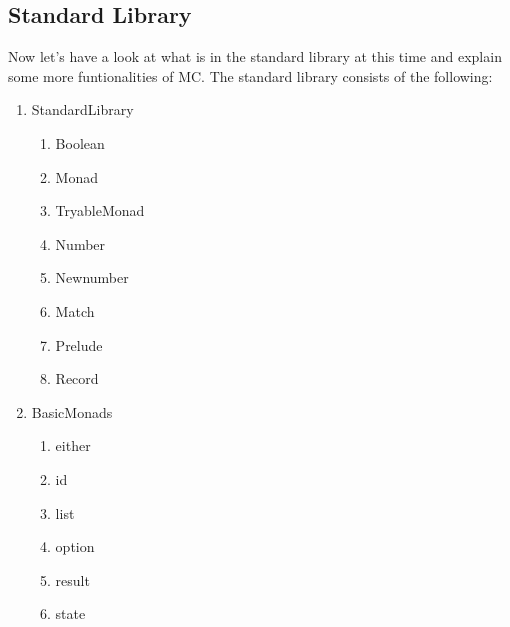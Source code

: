 








\subsection{Standard Library}
Now let's have a look at what is in the standard library at this time and explain some more funtionalities of MC.
The standard library consists of the following:
\begin{multicols}{2}
\begin{enumerate}
	\item StandardLibrary
		\begin{enumerate}
			\item Boolean
			\item Monad
			\item TryableMonad
			\item Number
			\item Newnumber
			\item Match
			\item Prelude
			\item Record
		\end{enumerate}
	\item BasicMonads
		\begin{enumerate}
			\item either
			\item id
			\item list
			\item option
			\item result
			\item state
		\end{enumerate}
\end{enumerate}
\end{multicols}

